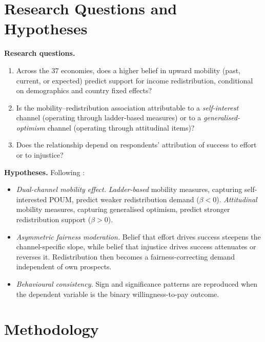 \documentclass[11pt,a4paper]{article}
\begin{document}
\section{Research Questions and Hypotheses}

\textbf{Research questions.}
\begin{enumerate}[leftmargin=28pt,itemsep=2pt,label=\textit{RQ\arabic*.}]
    \item Across the 37 economies, does a higher belief in upward mobility (past,
    current, or expected) predict support for income redistribution, conditional on
    demographics and country fixed effects?
    \item Is the mobility--redistribution association attributable to a
    \emph{self-interest} channel (operating through ladder-based measures) or to a
    \emph{generalised-optimism} channel (operating through attitudinal items)?
    \item Does the relationship depend on respondents' attribution of success to
    effort or to injustice?
\end{enumerate}

\textbf{Hypotheses.} Following \citet{benabou2001social, alesina2005preferences,
alesina2005fairness, alesina2018intergenerational, hirschman1973changing}:
\begin{itemize}[leftmargin=18pt,itemsep=2pt]
    \item[$H_{1}$:] \emph{Dual-channel mobility effect.} \emph{Ladder-based} mobility
    measures, capturing self-interested POUM, predict weaker redistribution demand
    ($\beta<0$). \emph{Attitudinal} mobility measures, capturing generalised optimism,
    predict stronger redistribution support ($\beta>0$).
    \item[$H_{2}$:] \emph{Asymmetric fairness moderation.} Belief that effort drives
    success steepens the channel-specific slope, while belief that injustice drives
    success attenuates or reverses it. Redistribution then becomes a fairness-correcting
    demand independent of own prospects.
    \item[$H_{3}$:] \emph{Behavioural consistency.} Sign and significance patterns are
    reproduced when the dependent variable is the binary willingness-to-pay outcome.
\end{itemize}

\section{Methodology}
\end{document}
